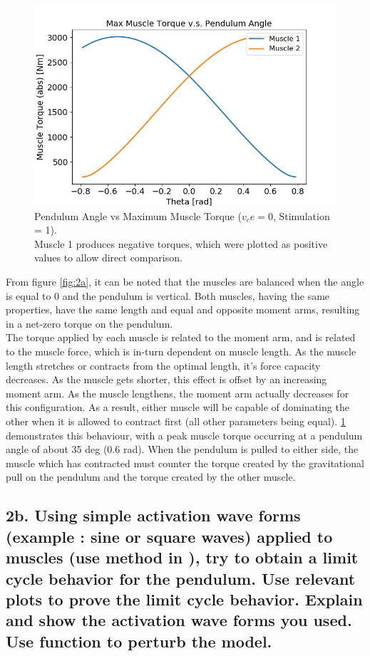 \documentclass{cmc}
\begin{document}
\begin{figure}[H]
    \centering
    \includegraphics[width=.6\textwidth]{2a/2a_torque.png}
    \caption{Pendulum Angle vs Maximum Muscle Torque ($v_ce = 0$, Stimulation = 1).\\ 
    Muscle 1 produces negative torques, which were plotted as positive values to allow direct comparison.}
    \label{fig:2aTorque}
\end{figure}

From figure \ref{fig:2a}, it can be noted that the muscles are balanced when the angle is equal to 0 and the pendulum is vertical. Both muscles, having the same properties, have the same length and equal and opposite moment arms, resulting in a net-zero torque on the pendulum.\\

The torque applied by each muscle is related to the moment arm, and is related to the muscle force, which is in-turn dependent on muscle length. As the muscle length stretches or contracts from the optimal length, it's force capacity decreases. As the muscle gets shorter, this effect is offset by an increasing moment arm. As the muscle lengthens, the moment arm actually decreases for this configuration. As a result, either muscle will be capable of dominating the other when it is allowed to contract first (all other parameters being equal). \ref{fig:2aTorque} demonstrates this behaviour, with a peak muscle torque occurring at a pendulum angle of about 35 deg (0.6 rad). When the pendulum is pulled to either side, the muscle which has contracted must counter the torque created by the gravitational pull on the pendulum and the torque created by the other muscle. 

\subsection*{2b. Using simple activation wave forms (example : sine or
  square waves) applied to muscles (use
   method in
  ), try to obtain a limit cycle behavior for
  the pendulum. Use relevant plots to prove the limit cycle behavior.
  Explain and show the activation wave forms you used. Use
  \newline {} function to perturb the model.}
  
\end{document}

